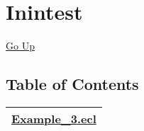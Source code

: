 \chapter*{\color{headtoc} Inintest}
\hypertarget{ecldoc:toc:root/Inintest}{}
\hyperlink{ecldoc:toc:}{Go Up}


\section*{Table of Contents}
{\renewcommand{\arraystretch}{1.5}
\begin{longtable}{|p{\textwidth}|}
\hline
\hyperlink{ecldoc:toc:Inintest.Example_3}{Example\_3.ecl} \\
\hline
\end{longtable}
}


